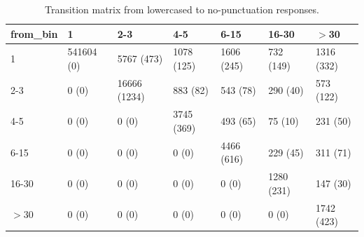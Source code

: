 \begin{table}[H]
\centering
\caption{Transition matrix from lowercased to no-punctuation responses.} 
\label{tab:tab-1-2}
\begin{tabular}{lllllll}
  \hline
from\_bin & 1 & 2-3 & 4-5 & 6-15 & 16-30 & $>$30 \\ 
  \hline
1 & 541604 (0) & 5767 (473) & 1078 (125) & 1606 (245) & 732 (149) & 1316 (332) \\ 
  2-3 & 0 (0) & 16666 (1234) & 883 (82) & 543 (78) & 290 (40) & 573 (122) \\ 
  4-5 & 0 (0) & 0 (0) & 3745 (369) & 493 (65) & 75 (10) & 231 (50) \\ 
  6-15 & 0 (0) & 0 (0) & 0 (0) & 4466 (616) & 229 (45) & 311 (71) \\ 
  16-30 & 0 (0) & 0 (0) & 0 (0) & 0 (0) & 1280 (231) & 147 (30) \\ 
  $>$30 & 0 (0) & 0 (0) & 0 (0) & 0 (0) & 0 (0) & 1742 (423) \\ 
   \hline
\end{tabular}
\end{table}
